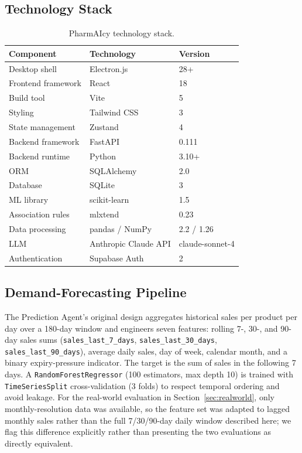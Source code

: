 \documentclass[12pt,a4paper]{article}
\begin{document}
\subsection{Technology Stack}

\begin{table}[H]
\centering
\caption{PharmAIcy technology stack.}
\label{tab:tech}
\renewcommand{\arraystretch}{1.2}
\begin{tabular}{lll}
\toprule
\textbf{Component} & \textbf{Technology} & \textbf{Version} \\
\midrule
Desktop shell & Electron.js & 28+ \\
Frontend framework & React & 18 \\
Build tool & Vite & 5 \\
Styling & Tailwind CSS & 3 \\
State management & Zustand & 4 \\
Backend framework & FastAPI & 0.111 \\
Backend runtime & Python & 3.10+ \\
ORM & SQLAlchemy & 2.0 \\
Database & SQLite & 3 \\
ML library & scikit-learn & 1.5 \\
Association rules & mlxtend & 0.23 \\
Data processing & pandas / NumPy & 2.2 / 1.26 \\
LLM & Anthropic Claude API & claude-sonnet-4 \\
Authentication & Supabase Auth & 2 \\
\bottomrule
\end{tabular}
\end{table}

\subsection{Demand-Forecasting Pipeline}

The Prediction Agent's original design aggregates historical sales per product per day over a 180-day window and engineers seven features: rolling 7-, 30-, and 90-day sales sums (\texttt{sales\_last\_7\_days}, \texttt{sales\_last\_30\_days}, \texttt{sales\_last\_90\_days}), average daily sales, day of week, calendar month, and a binary expiry-pressure indicator. The target is the sum of sales in the following 7 days. A \texttt{RandomForestRegressor} (100 estimators, max depth 10) is trained with \texttt{TimeSeriesSplit} cross-validation (3 folds) to respect temporal ordering and avoid leakage. For the real-world evaluation in Section~\ref{sec:realworld}, only monthly-resolution data was available, so the feature set was adapted to lagged monthly sales rather than the full 7/30/90-day daily window described here; we flag this difference explicitly rather than presenting the two evaluations as directly equivalent.
\end{document}

